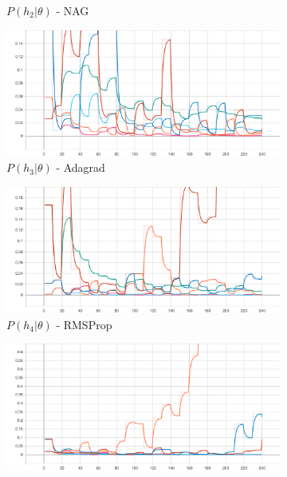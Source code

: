 \begin{figure}[htbp]
\begin{subfigure}{0.5\textwidth}
		\caption{$P\left(h_{2} | \theta \right)$ - \Acs{NAG}}
		\label{fig:results:case_study:iris:p_H:2}
	\end{subfigure}
	\begin{subfigure}{0.5\textwidth}
		\centering
		\includegraphics[width=\textwidth]{analysis/bhh_case_study/iris/p_H[3].png}
		\caption{$P\left(h_{3} | \theta \right)$ - \Acs{Adagrad}}
		\label{fig:results:case_study:iris:p_H:3}
	\end{subfigure}
	\par\medskip
	\begin{subfigure}{0.5\textwidth}
		\centering
		\includegraphics[width=\textwidth]{analysis/bhh_case_study/iris/p_H[4].png}
		\caption{$P\left(h_{4} | \theta \right)$ - \Acs{RMSProp}}
		\label{fig:results:case_study:iris:p_H:4}
	\end{subfigure}
	\begin{subfigure}{0.5\textwidth}
		\centering
		\includegraphics[width=\textwidth]{analysis/bhh_case_study/iris/p_H[5].png}

\end{subfigure}
\end{figure}
